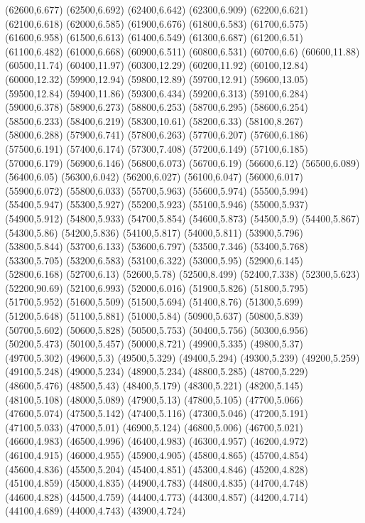 (62600,6.677)
(62500,6.692)
(62400,6.642)
(62300,6.909)
(62200,6.621)
(62100,6.618)
(62000,6.585)
(61900,6.676)
(61800,6.583)
(61700,6.575)
(61600,6.958)
(61500,6.613)
(61400,6.549)
(61300,6.687)
(61200,6.51)
(61100,6.482)
(61000,6.668)
(60900,6.511)
(60800,6.531)
(60700,6.6)
(60600,11.88)
(60500,11.74)
(60400,11.97)
(60300,12.29)
(60200,11.92)
(60100,12.84)
(60000,12.32)
(59900,12.94)
(59800,12.89)
(59700,12.91)
(59600,13.05)
(59500,12.84)
(59400,11.86)
(59300,6.434)
(59200,6.313)
(59100,6.284)
(59000,6.378)
(58900,6.273)
(58800,6.253)
(58700,6.295)
(58600,6.254)
(58500,6.233)
(58400,6.219)
(58300,10.61)
(58200,6.33)
(58100,8.267)
(58000,6.288)
(57900,6.741)
(57800,6.263)
(57700,6.207)
(57600,6.186)
(57500,6.191)
(57400,6.174)
(57300,7.408)
(57200,6.149)
(57100,6.185)
(57000,6.179)
(56900,6.146)
(56800,6.073)
(56700,6.19)
(56600,6.12)
(56500,6.089)
(56400,6.05)
(56300,6.042)
(56200,6.027)
(56100,6.047)
(56000,6.017)
(55900,6.072)
(55800,6.033)
(55700,5.963)
(55600,5.974)
(55500,5.994)
(55400,5.947)
(55300,5.927)
(55200,5.923)
(55100,5.946)
(55000,5.937)
(54900,5.912)
(54800,5.933)
(54700,5.854)
(54600,5.873)
(54500,5.9)
(54400,5.867)
(54300,5.86)
(54200,5.836)
(54100,5.817)
(54000,5.811)
(53900,5.796)
(53800,5.844)
(53700,6.133)
(53600,6.797)
(53500,7.346)
(53400,5.768)
(53300,5.705)
(53200,6.583)
(53100,6.322)
(53000,5.95)
(52900,6.145)
(52800,6.168)
(52700,6.13)
(52600,5.78)
(52500,8.499)
(52400,7.338)
(52300,5.623)
(52200,90.69)
(52100,6.993)
(52000,6.016)
(51900,5.826)
(51800,5.795)
(51700,5.952)
(51600,5.509)
(51500,5.694)
(51400,8.76)
(51300,5.699)
(51200,5.648)
(51100,5.881)
(51000,5.84)
(50900,5.637)
(50800,5.839)
(50700,5.602)
(50600,5.828)
(50500,5.753)
(50400,5.756)
(50300,6.956)
(50200,5.473)
(50100,5.457)
(50000,8.721)
(49900,5.335)
(49800,5.37)
(49700,5.302)
(49600,5.3)
(49500,5.329)
(49400,5.294)
(49300,5.239)
(49200,5.259)
(49100,5.248)
(49000,5.234)
(48900,5.234)
(48800,5.285)
(48700,5.229)
(48600,5.476)
(48500,5.43)
(48400,5.179)
(48300,5.221)
(48200,5.145)
(48100,5.108)
(48000,5.089)
(47900,5.13)
(47800,5.105)
(47700,5.066)
(47600,5.074)
(47500,5.142)
(47400,5.116)
(47300,5.046)
(47200,5.191)
(47100,5.033)
(47000,5.01)
(46900,5.124)
(46800,5.006)
(46700,5.021)
(46600,4.983)
(46500,4.996)
(46400,4.983)
(46300,4.957)
(46200,4.972)
(46100,4.915)
(46000,4.955)
(45900,4.905)
(45800,4.865)
(45700,4.854)
(45600,4.836)
(45500,5.204)
(45400,4.851)
(45300,4.846)
(45200,4.828)
(45100,4.859)
(45000,4.835)
(44900,4.783)
(44800,4.835)
(44700,4.748)
(44600,4.828)
(44500,4.759)
(44400,4.773)
(44300,4.857)
(44200,4.714)
(44100,4.689)
(44000,4.743)
(43900,4.724)
